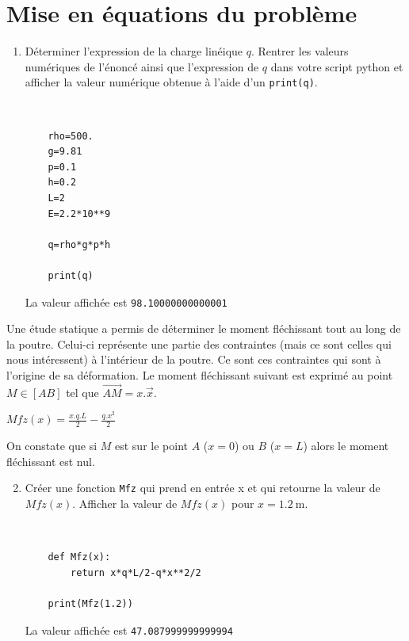 \section*{Mise en équations du problème}

\begin{enumerate}
\item Déterminer l'expression de la charge linéique $q$. Rentrer les valeurs numériques de l'énoncé ainsi que l'expression de $q$ dans votre script python et afficher la valeur numérique obtenue à l'aide d'un \verb?print(q)?. 
 \begin{solution}~\ \\
  \begin{verbatim}
	rho=500.
	g=9.81
	p=0.1
	h=0.2
	L=2
	E=2.2*10**9

	q=rho*g*p*h

	print(q)
 \end{verbatim}
 La valeur affichée est \verb?98.10000000000001?
\end{solution}
\end{enumerate}

Une étude statique a permis de déterminer le moment fléchissant tout au long de la poutre. Celui-ci représente une partie des contraintes (mais ce sont celles qui nous intéressent) à l'intérieur de la poutre. Ce sont ces contraintes qui sont à l'origine de sa déformation. Le moment fléchissant suivant est exprimé au point $M\in[AB]$ tel que $\overrightarrow{AM}=x.\overrightarrow{x}$.
\begin{center}
$Mfz(x)=\frac{x.q.L}{2}-\frac{q.x^2}{2}$
\end{center}

On constate que si $M$ est sur le point $A$ ($x=0$) ou $B$ ($x=L$) alors le moment fléchissant est nul.

\begin{enumerate}
\setcounter{enumi}{1}
\item Créer une fonction \verb?Mfz? qui prend en entrée x et qui retourne la valeur de $Mfz(x)$. Afficher la valeur de $Mfz(x)$  pour $x=\SI{1,2}{\meter}$.
 \begin{solution}~\ \\
  \begin{verbatim}
	def Mfz(x):
    	return x*q*L/2-q*x**2/2

	print(Mfz(1.2))
 \end{verbatim}
 La valeur affichée est \verb?47.087999999999994?
\end{solution}
\end{enumerate}

